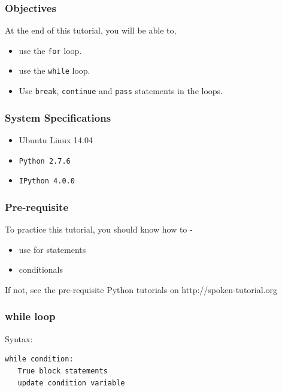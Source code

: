 \documentclass[17pt]{beamer}
\begin{document}
\begin{frame}
\frametitle{Objectives}
\label{sec-2}

  At the end of this tutorial, you will be able to, \pause


\begin{itemize}
\item use the \texttt{for} loop.\pause
\item use the \texttt{while} loop.\pause
\item Use \texttt{break}, \texttt{continue} and \texttt{pass} statements in the loops.
\end{itemize}
\end{frame}
\begin{frame}
\frametitle{System Specifications}\pause
\begin{itemize}
\item Ubuntu Linux 14.04\pause
\item \texttt{Python 2.7.6} \pause
\item \texttt{IPython 4.0.0}
\end{itemize}
\end{frame}
\begin{frame}
\frametitle{Pre-requisite}
\label{sec-3}

  To practice this tutorial, you should know how to -\pause

\begin{itemize}
\item use for statements\pause
\item conditionals
\end{itemize}
If not, see the pre-requisite Python tutorials on {\color{blue}http://spoken-tutorial.org}
\end{frame}
\begin{frame}[fragile]
\frametitle{while loop}

Syntax:

\lstset{language=Python}
\begin{lstlisting}
while condition:
   True block statements
   update condition variable
\end{lstlisting}  
\end{frame}
\end{document}
